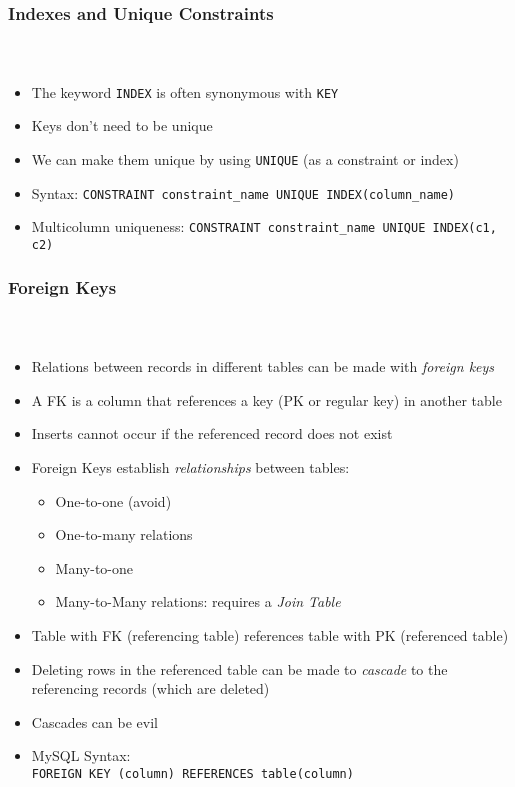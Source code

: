 \documentclass{beamer}
\begin{document}
\begin{frame}[fragile]
  \frametitle{Indexes and Unique Constraints}
  \framesubtitle{~}

  \begin{itemize}
    \item The keyword \texttt{INDEX} is often synonymous with \texttt{KEY}
    \item Keys don't need to be unique
    \item We can make them unique by using \texttt{UNIQUE} (as a constraint or index)
    \item Syntax: \texttt{CONSTRAINT constraint_name UNIQUE INDEX(column_name)}
    \item Multicolumn uniqueness: \texttt{CONSTRAINT constraint_name UNIQUE INDEX(c1, c2)}
  \end{itemize}

\end{frame}

\begin{frame}
  \frametitle{Foreign Keys}
  \framesubtitle{~}

\begin{itemize}
  \item Relations between records in different tables can be made with \emph{foreign keys}
  \item A FK is a column that references a key (PK or regular key) in another table
  \item Inserts cannot occur if the referenced record does not exist
  \item Foreign Keys establish \emph{relationships} between tables:
   \begin{itemize}
      \item One-to-one (avoid)
      \item One-to-many relations
      \item Many-to-one
      \item Many-to-Many relations: requires a \emph{Join Table}
  \end{itemize}
\framebreak
  \item Table with FK (referencing table) references table with PK (referenced table)
  \item Deleting rows in the referenced table can be made to \emph{cascade} to the referencing records (which are deleted)
  \item Cascades can be evil
  \item MySQL Syntax:\\
	\texttt{FOREIGN KEY (column) REFERENCES table(column)}
\end{itemize}

\end{frame}
\end{document}
